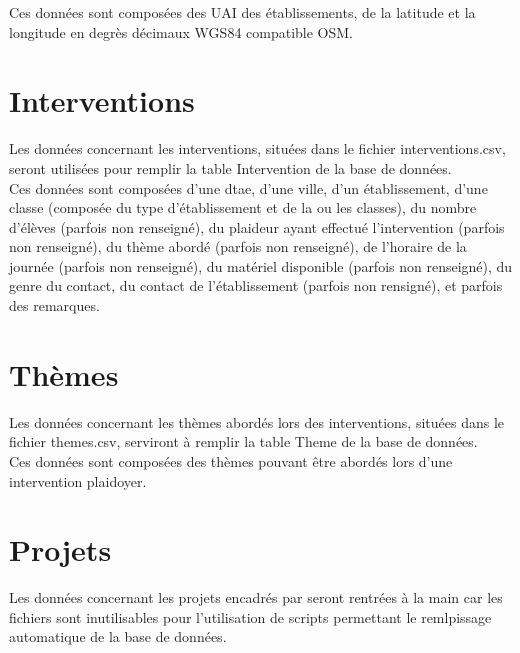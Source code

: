	Ces données sont composées des UAI des établissements, de la latitude et la longitude en degrès décimaux WGS84 compatible OSM.
	
\section{Interventions}
	Les données concernant les interventions, situées dans le fichier interventions.csv, seront utilisées pour remplir la table Intervention de la base de données. \\
	
	Ces données sont composées d'une dtae, d'une ville, d'un établissement, d'une classe (composée du type d'établissement et de la ou les classes), du nombre d'élèves (parfois non renseigné), du plaideur ayant effectué l'intervention (parfois non renseigné), du thème abordé (parfois non renseigné), de l'horaire de la journée (parfois non renseigné), du matériel disponible (parfois non renseigné), du genre du contact, du contact de l'établissement (parfois non rensigné), et parfois des remarques.
	
\section{Thèmes}
	Les données concernant les thèmes abordés lors des interventions, situées dans le fichier themes.csv, serviront à remplir la table Theme de la base de données. \\
	
	Ces données sont composées des thèmes pouvant être abordés lors d'une intervention plaidoyer.
	
\section{Projets}
	Les données concernant les projets encadrés par \nomClient seront rentrées à la main car les fichiers sont inutilisables pour l'utilisation de scripts permettant le remlpissage automatique de la base de données. \\
	